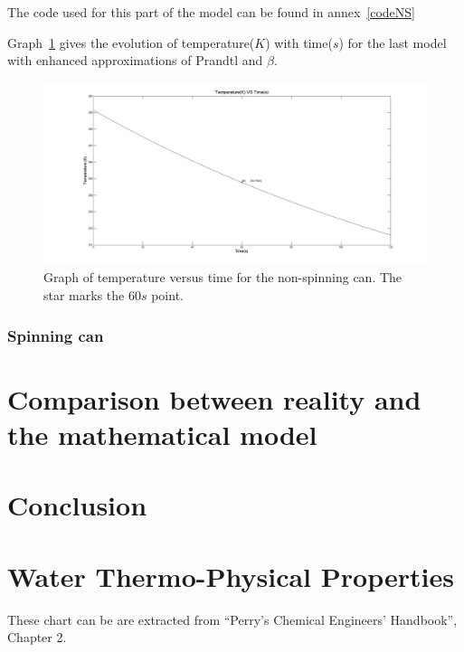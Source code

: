 \documentclass{report}
\begin{document}
	The code used for this part of the model can be found in annex~\ref{codeNS}
	
	
	Graph~\ref{NSg} gives the evolution of temperature($K$) with time($s$) for the last model with enhanced approximations of Prandtl and $\beta$.
	\begin{figure}
		\centering
		\includegraphics[width=\textwidth]{img/NSg.jpg}
		\caption{Graph of temperature versus time for the non-spinning can. The star marks the $60s$ point.}
		\label{NSg}
	\end{figure}
	
	
	
	\subsection{Spinning can}
	
	\chapter[Reality and mathematical model]{Comparison between reality and the mathematical model}\label{rvmm}
	
	\chapter{Conclusion}\label{ccl}
	
	
	\appendix
	
	\chapter{Water Thermo-Physical Properties}\label{WTPP}
	
	These chart can be are extracted from ``Perry’s	Chemical Engineers’ Handbook'', Chapter 2\cite{properties}.
	
	
	
\end{document}
